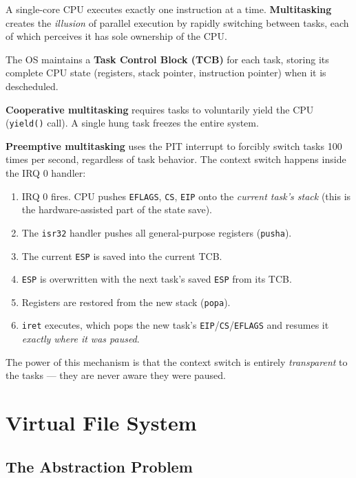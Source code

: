 \documentclass[12pt,a4paper]{report}
\begin{document}
A single-core CPU executes exactly one instruction at a time. \textbf{Multitasking}
creates the \textit{illusion} of parallel execution by rapidly switching between tasks,
each of which perceives it has sole ownership of the CPU.

The OS maintains a \textbf{Task Control Block (TCB)} for each task, storing its complete
CPU state (registers, stack pointer, instruction pointer) when it is descheduled.

\textbf{Cooperative multitasking} requires tasks to voluntarily yield the CPU
(\texttt{yield()} call). A single hung task freezes the entire system.

\textbf{Preemptive multitasking} uses the PIT interrupt to forcibly switch tasks
100 times per second, regardless of task behavior. The context switch happens inside
the IRQ 0 handler:

\begin{enumerate}
    \item IRQ 0 fires. CPU pushes \texttt{EFLAGS}, \texttt{CS}, \texttt{EIP} onto the
    \textit{current task's stack} (this is the hardware-assisted part of the state save).
    \item The \texttt{isr32} handler pushes all general-purpose registers (\texttt{pusha}).
    \item The current \texttt{ESP} is saved into the current TCB.
    \item \texttt{ESP} is overwritten with the next task's saved \texttt{ESP} from its TCB.
    \item Registers are restored from the new stack (\texttt{popa}).
    \item \texttt{iret} executes, which pops the new task's \texttt{EIP}/\texttt{CS}/\texttt{EFLAGS}
    and resumes it \textit{exactly where it was paused}.
\end{enumerate}

The power of this mechanism is that the context switch is entirely \textit{transparent}
to the tasks --- they are never aware they were paused.

\newpage

\chapter{Virtual File System}

\section{The Abstraction Problem}
\end{document}
